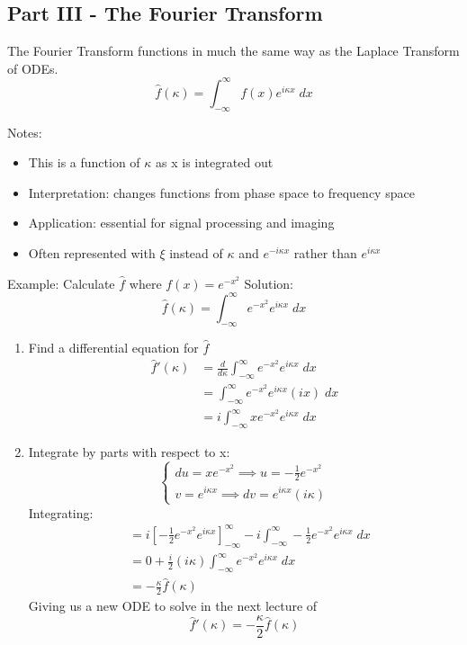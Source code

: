 \documentclass[12pt]{article}
\renewcommand{\hat}[1]{\widehat{#1}}
\begin{document}
\subsection*{Part III - The Fourier Transform}
The Fourier Transform functions in much the same way as the Laplace Transform of ODEs.
\[\hat{f}(\kappa) = \int_{-\infty}^\infty f(x)e^{i\kappa x}
\; dx\]

Notes:
\begin{itemize}
    \item This is a function of $\kappa$ as x is integrated out
    \item Interpretation: changes functions from phase space to frequency space
    \item Application: essential for signal processing and imaging
    \item Often represented with $\xi$ instead of $\kappa$ and $e^{-i\kappa x}$ rather than $e^{i\kappa x}$
\end{itemize}

Example: Calculate $\hat{f}$ where $f(x) = e^{-x^2}$
Solution:
\[\hat{f}(\kappa) = \int_{-\infty}^\infty e^{-x^2}e^{i\kappa x}\; dx\]

\begin{enumerate}
    \item Find a differential equation for $\hat{f}$
    \begin{align*}
        \hat{f}'(\kappa) &= \frac{d}{d\kappa}\int_{-\infty}^\infty e^{-x^2}e^{i\kappa x}\; dx\\
        &= \int_{-\infty}^\infty e^{-x^2} e^{i\kappa x}(ix)\; dx\\
        &= i \int_{-\infty}^\infty xe^{-x^2} e^{i\kappa x}\; dx
    \end{align*} 
    \item Integrate by parts with respect to x:
    \[\begin{cases}
        du = xe^{-x^2} \implies u = - \frac{1}{2}e^{-x^2}\\
        v = e^{i\kappa x} \implies dv = e^{i\kappa x}(i\kappa)
    \end{cases}\]
    Integrating:
    \begin{align*}
        &= i\left[-\frac{1}{2}e^{-x^2}e^{i\kappa x}\right]_{-\infty}^\infty - i\int_{-\infty}^\infty -\frac{1}{2}e^{-x^2}e^{i\kappa x}\; dx\\
        &= 0 + \frac{i}{2}(i\kappa) \int_{-\infty}^\infty e^{-x^2} e^{i\kappa x}\; dx \\
        &= -\frac{\kappa}{2}\hat{f}(\kappa)
    \end{align*}
    Giving us a new ODE to solve in the next lecture of 
    \[\hat{f}'(\kappa) = -\frac{\kappa}{2}\hat{f}(\kappa)\]
\end{enumerate}
\end{document}
